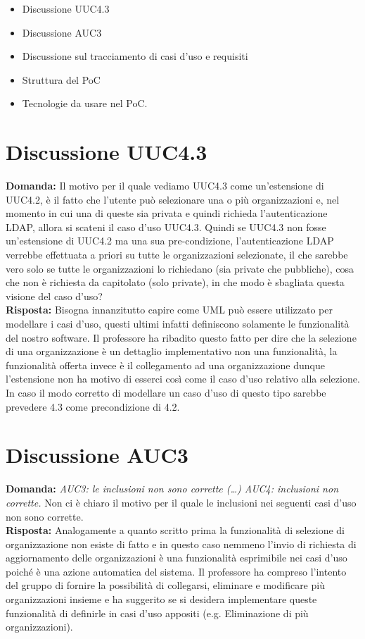 \documentclass{article}
\begin{document}
\begin{itemize}
  \item Discussione UUC4.3
  \item Discussione AUC3
  \item Discussione sul tracciamento di casi d'uso e requisiti
  \item Struttura del PoC
  \item Tecnologie da usare nel PoC.
\end{itemize}
\section{Discussione UUC4.3}%
\label{sec:discussione_uuc_4.3}
\textbf{Domanda:} Il motivo per il quale vediamo UUC4.3 come un'estensione di UUC4.2, è il fatto che l'utente può selezionare una o più organizzazioni e, nel momento in cui una di queste sia privata e quindi richieda l'autenticazione LDAP, allora si scateni il caso d'uso UUC4.3.
Quindi se UUC4.3 non fosse un'estensione di UUC4.2 ma una sua pre-condizione, l'autenticazione LDAP verrebbe effettuata a priori su tutte le organizzazioni selezionate, il che sarebbe vero solo se tutte le organizzazioni lo richiedano (sia private che pubbliche), cosa che non è richiesta da capitolato (solo private), in che modo è sbagliata questa visione del caso d'uso? \\
\textbf{Risposta:} Bisogna innanzitutto capire come UML può essere utilizzato per modellare i casi d'uso, questi ultimi infatti definiscono solamente le funzionalità del nostro software. Il professore ha ribadito questo fatto per dire che la selezione di una organizzazione è un dettaglio implementativo non una funzionalità, la funzionalità offerta invece è il collegamento ad una organizzazione dunque l'estensione non ha motivo di esserci così come il caso d'uso relativo alla selezione.
In caso il modo corretto di modellare un caso d'uso di questo tipo sarebbe prevedere 4.3 come precondizione di 4.2.
\section{Discussione AUC3}%
\label{sec:discussione_auc3}
\textbf{Domanda:} \textit{AUC3: le inclusioni non sono corrette (\ldots) AUC4: inclusioni non corrette.} Non ci è chiaro il motivo per il quale le inclusioni nei seguenti casi d'uso non sono corrette.\\
\textbf{Risposta:} Analogamente a quanto scritto prima la funzionalità di selezione di organizzazione non esiste di fatto e in questo caso nemmeno l'invio di richiesta di aggiornamento delle organizzazioni è una funzionalità esprimibile nei casi d'uso poiché è una azione automatica del sistema.
Il professore ha compreso l'intento del gruppo di fornire la possibilità di collegarsi, eliminare e modificare più organizzazioni insieme e ha suggerito se si desidera implementare queste funzionalità di definirle in casi d'uso appositi (e.g. Eliminazione di più organizzazioni).
\end{document}
